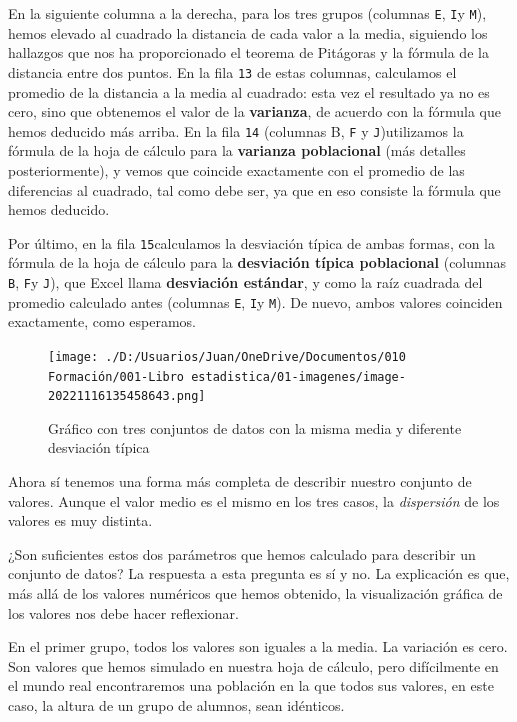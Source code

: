\documentclass[
  letterpaper,
]{scrbook}
\begin{document}
En la siguiente columna a la derecha, para los tres grupos (columnas
\texttt{E}, \texttt{I}y \texttt{M}), hemos elevado al cuadrado la
distancia de cada valor a la media, siguiendo los hallazgos que nos ha
proporcionado el teorema de Pitágoras y la fórmula de la distancia entre
dos puntos. En la fila \texttt{13} de estas columnas, calculamos el
promedio de la distancia a la media al cuadrado: esta vez el resultado
ya no es cero, sino que obtenemos el valor de la \textbf{varianza}, de
acuerdo con la fórmula que hemos deducido más arriba. En la fila
\texttt{14} (columnas B, \texttt{F} y \texttt{J})utilizamos la fórmula
de la hoja de cálculo para la \textbf{varianza poblacional} (más
detalles posteriormente), y vemos que coincide exactamente con el
promedio de las diferencias al cuadrado, tal como debe ser, ya que en
eso consiste la fórmula que hemos deducido.

Por último, en la fila \texttt{15}calculamos la desviación típica de
ambas formas, con la fórmula de la hoja de cálculo para la
\textbf{desviación típica poblacional} (columnas \texttt{B}, \texttt{F}y
\texttt{J}), que Excel llama \textbf{desviación estándar}, y como la
raíz cuadrada del promedio calculado antes (columnas \texttt{E},
\texttt{I}y \texttt{M}). De nuevo, ambos valores coinciden exactamente,
como esperamos.

\begin{figure}

{\centering \texttt{[image: ./D:/Usuarios/Juan/OneDrive/Documentos/010 Formación/001-Libro estadistica/01-imagenes/image-20221116135458643.png]}

}

\caption{Gráfico con tres conjuntos de datos con la misma media y
diferente desviación típica}

\end{figure}

Ahora sí tenemos una forma más completa de describir nuestro conjunto de
valores. Aunque el valor medio es el mismo en los tres casos, la
\emph{dispersión} de los valores es muy distinta.

¿Son suficientes estos dos parámetros que hemos calculado para describir
un conjunto de datos? La respuesta a esta pregunta es sí y no. La
explicación es que, más allá de los valores numéricos que hemos
obtenido, la visualización gráfica de los valores nos debe hacer
reflexionar.

En el primer grupo, todos los valores son iguales a la media. La
variación es cero. Son valores que hemos simulado en nuestra hoja de
cálculo, pero difícilmente en el mundo real encontraremos una población
en la que todos sus valores, en este caso, la altura de un grupo de
alumnos, sean idénticos.
\end{document}
